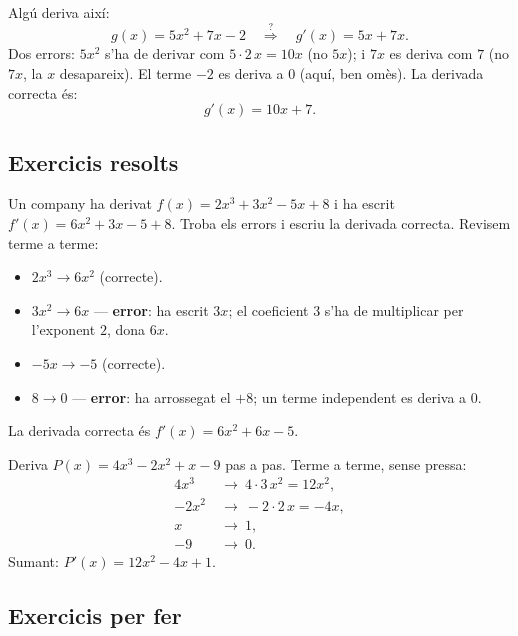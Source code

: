 \begin{exemple}
Algú deriva així:
\[
g(x)=5x^2+7x-2 \quad\overset{?}{\Longrightarrow}\quad g'(x)=5x+7x.
\]
Dos errors: $5x^2$ s'ha de derivar com $5\cdot 2\,x=10x$ (no $5x$); i $7x$ es deriva
com $7$ (no $7x$, la $x$ desapareix). El terme $-2$ es deriva a $0$ (aquí, ben omès).
La derivada correcta és:
\[
g'(x)=10x+7.
\]
\end{exemple}

\subsection{Exercicis resolts}

\begin{exresolt}
Un company ha derivat $f(x)=2x^3+3x^2-5x+8$ i ha escrit
$f'(x)=6x^2+3x-5+8$. Troba els errors i escriu la derivada correcta.
\solucio
Revisem terme a terme:
\begin{itemize}[leftmargin=1.4em, itemsep=2pt]
  \item $2x^3\to 6x^2$ \checkmark (correcte).
  \item $3x^2\to 6x$ — \textbf{error}: ha escrit $3x$; el coeficient $3$ s'ha de
        multiplicar per l'exponent $2$, dona $6x$.
  \item $-5x\to -5$ \checkmark (correcte).
  \item $8\to 0$ — \textbf{error}: ha arrossegat el $+8$; un terme independent es
        deriva a $0$.
\end{itemize}
La derivada correcta és $f'(x)=6x^2+6x-5$.
\end{exresolt}

\begin{exresolt}
Deriva $P(x)=4x^3-2x^2+x-9$ pas a pas.
\solucio
Terme a terme, sense pressa:
\begin{align*}
4x^3 &\ \to\ 4\cdot 3\,x^2=12x^2,\\
-2x^2 &\ \to\ -2\cdot 2\,x=-4x,\\
x &\ \to\ 1,\\
-9 &\ \to\ 0.
\end{align*}
Sumant: $P'(x)=12x^2-4x+1$.
\end{exresolt}

\subsection{Exercicis per fer}

